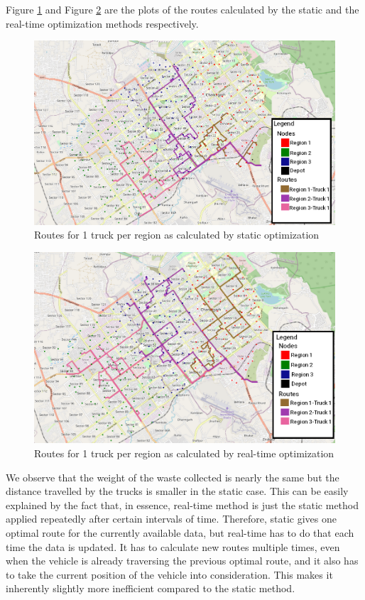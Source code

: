 \documentclass[12pt]{article}
\begin{document}
Figure \ref{fig4} and Figure \ref{fig5} are the plots of the routes calculated by the static and the real-time optimization methods respectively.

\begin{figure}[H]
    \centering
    \includegraphics[scale=0.4]{Static_Unweighted.png} %
    \caption{Routes for 1 truck per region as calculated by static optimization}\label{fig4}
\end{figure}
\begin{figure}[H]
    \centering
    \includegraphics[scale=0.4]{Dynamic_weighted_1_Truck.png} %
    \caption{Routes for 1 truck per region as calculated by real-time optimization}\label{fig5}
\end{figure}
We observe that the weight of the waste collected is nearly the same but the distance travelled by the trucks is smaller in the static case. This can be easily explained by the fact that, in essence, real-time method is just the static method applied repeatedly after certain intervals of time. Therefore, static gives one optimal route for the currently available data, but real-time has to do that each time the data is updated. It has to calculate new routes multiple times, even when the vehicle is already traversing the previous optimal route, and it also has to take the current position of the vehicle into consideration. This makes it inherently slightly more inefficient compared to the static method. 
\end{document}
